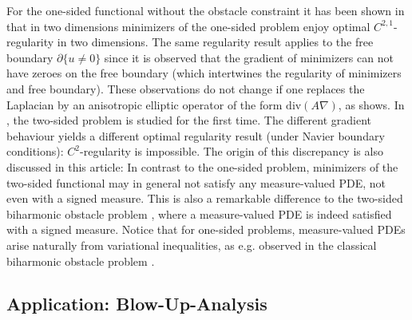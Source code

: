 \documentclass[twoside,11pt]{article}
\theoremstyle{definition}
\begin{document}
 For the one-sided functional without the obstacle constraint it has been shown in \cite{MuellerAMPA,MuellerPolyharmonic} that in two dimensions minimizers of the one-sided problem enjoy optimal $C^{2,1}$-regularity in two dimensions. The same regularity result applies to the free boundary $\partial \{ u \neq 0 \}$ since it is observed that the gradient of minimizers can not have zeroes on the free boundary (which intertwines the regularity of minimizers and free boundary). These observations do not change if one replaces the Laplacian by an anisotropic elliptic operator of the form $\mathrm{div}(A\nabla)$, as \cite{MuellerAnisotropic} shows. In \cite{GMMathAnn}, the two-sided problem is studied for the first time. The different gradient behaviour yields a different optimal regularity result (under Navier boundary conditions): $C^2$-regularity is impossible. The origin of this discrepancy is also discussed in this article: In contrast to the one-sided problem, minimizers of the two-sided functional may in general not satisfy any measure-valued PDE, not even with a signed measure. This is also a remarkable difference to the two-sided biharmonic obstacle problem \cite{TwoSidedObstacle}, where a measure-valued PDE is indeed satisfied with a signed measure. Notice that for one-sided problems, measure-valued PDEs arise naturally from variational inequalities, as e.g. observed in the classical biharmonic obstacle problem \cite{CaffarelliFriedman}.  



\subsection{Application: Blow-Up-Analysis}\label{subsec:appl}
\end{document}
